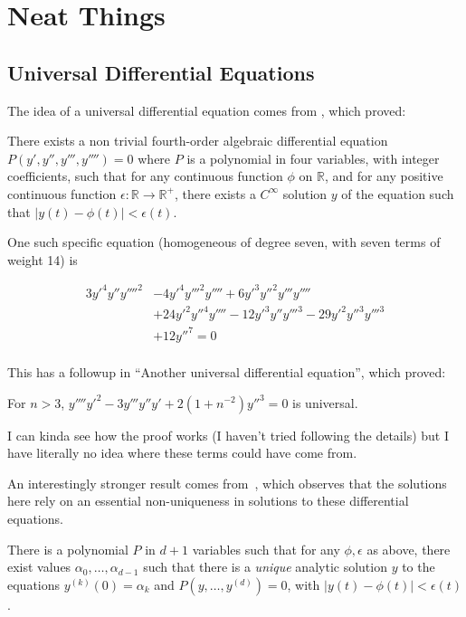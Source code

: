 \chapter{Neat Things}

\section{Universal Differential Equations}

The idea of a universal differential equation comes from \cite{rubel1981universal},
which proved:

\begin{theorem}
There exists a non trivial fourth-order algebraic differential equation \(P(y', y'', y''', y'''') = 0\)
where \(P\) is a polynomial in four variables, with integer coefficients, such that for any continuous function \(\phi\) on \(\mathbb{R}\),
and for any positive continuous function \(\epsilon: \mathbb{R} \to \mathbb{R}^+\),
there exists a \(C^\infty\) solution \(y\) of the equation such that \(|y(t) - \phi(t)| < \epsilon(t)\).

One such specific equation (homogeneous of degree seven, with seven terms
of weight 14) is

\begin{align*}
3{y'}^4 y'' {y''''}^2 &- 4 {y'}^4 {y'''}^2 y'''' + 6 {y'}^3 {y''}^2 y''' y'''' \\
& + 24 {y'}^2 {y''}^4 y'''' - 12 {y'}^3 y'' {y'''}^3 - 29 {y'}^2 {y''}^3 {y'''}^3 \\
& + 12 {y''}^7 = 0\\
\end{align*}
\end{theorem}

This has a followup in ``Another universal differential equation''\cite{briggs2002another},
which proved:

\begin{theorem}
For \(n > 3\), \(y'''' {y'}^2 - 3 y''' y'' y' + 2 (1 + n^{-2}) {y''}^3 = 0\) is universal.
\end{theorem}

I can kinda see how the proof works (I haven't tried following the details) but I have literally no idea where these terms could have come from.

An interestingly stronger result comes from~\cite{bournez2017universal},
which observes that the solutions here rely on an essential non-uniqueness in solutions to these differential equations.

\begin{theorem}
There is a polynomial \(P\) in \(d + 1\) variables such that for any \(\phi, \epsilon\) as above,
there exist values \(\alpha_0, \ldots, \alpha_{d - 1}\) such that there is a \emph{unique} analytic solution \(y\) to the equations \(y^{(k)}(0) = \alpha_k\) and \(P(y, \ldots, y^{(d)}) = 0\),
with \(|y(t) - \phi(t)| < \epsilon(t)\).
\end{theorem}

